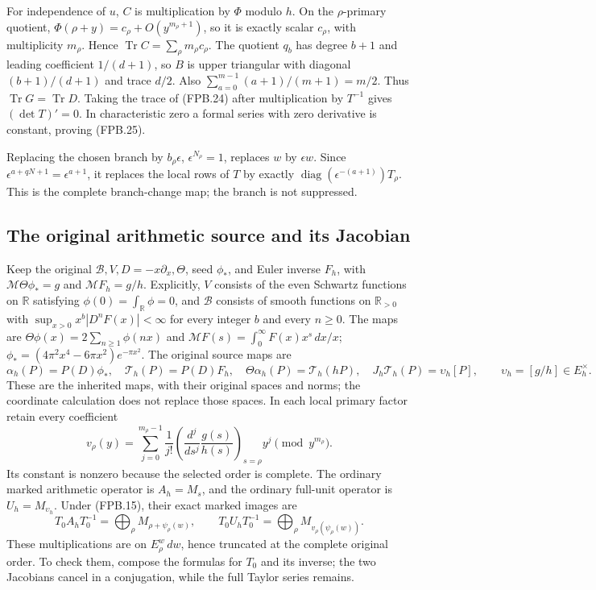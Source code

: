 For independence of \(u\), \(C\) is multiplication by \(\Phi\)
modulo \(h\). On the \(\rho\)-primary quotient,
\(\Phi(\rho+y)=c_\rho+O(y^{m_\rho+1})\), so it is exactly scalar
\(c_\rho\), with multiplicity \(m_\rho\). Hence
\(\operatorname{Tr}C=\sum_\rho m_\rho c_\rho\).
The quotient \(q_b\) has degree \(b+1\) and leading coefficient
\(1/(d+1)\), so \(B\) is upper triangular with diagonal
\((b+1)/(d+1)\) and trace \(d/2\). Also
\(\sum_{a=0}^{m-1}(a+1)/(m+1)=m/2\). Thus
\(\operatorname{Tr}G=\operatorname{Tr}D\).
Taking the trace of (FPB.24) after multiplication by \(T^{-1}\)
gives \((\det T)'=0\). In characteristic zero a formal series with
zero derivative is constant, proving (FPB.25).

Replacing the chosen branch by \(b_\rho\epsilon\),
\(\epsilon^{N_\rho}=1\), replaces \(w\) by \(\epsilon w\).
Since \(\epsilon^{a+qN+1}=\epsilon^{a+1}\), it replaces the local
rows of \(T\) by exactly
\(\operatorname{diag}(\epsilon^{-(a+1)})T_\rho\).
This is the complete branch-change map; the branch is not suppressed.

\subsection{The original arithmetic source and its Jacobian}

Keep the original \(\mathscr B,V,D=-x\partial_x,\Theta\), seed
\(\phi_*\), and Euler inverse \(F_h\), with
\(\mathcal M\Theta\phi_*=g\) and \(\mathcal M F_h=g/h\).
Explicitly, \(V\) consists of the even Schwartz functions on
\(\mathbb R\) satisfying \(\phi(0)=\int_{\mathbb R}\phi=0\),
and \(\mathscr B\) consists of smooth functions on
\(\mathbb R_{>0}\) with
\(\sup_{x>0}x^b|D^nF(x)|<\infty\) for every integer \(b\)
and every \(n\ge0\). The maps are
\(\Theta\phi(x)=2\sum_{n\ge1}\phi(nx)\) and
\(\mathcal MF(s)=\int_0^\infty F(x)x^s\,dx/x\);
\(\phi_*=(4\pi^2x^4-6\pi x^2)e^{-\pi x^2}\).
The original source maps are
\[
 \alpha_h(P)=P(D)\phi_*,\quad
 \mathcal T_h(P)=P(D)F_h,\quad
 \Theta\alpha_h(P)=\mathcal T_h(hP),\quad
 J_h\mathcal T_h(P)=\upsilon_h[P],
 \qquad \upsilon_h=[g/h]\in E_h^\times.
 \tag{FPB.26}\label{eq:fpb-theta}
\]
These are the inherited maps, with their original spaces and norms;
the coordinate calculation does not replace those spaces. In each
local primary factor retain every coefficient
\[
 v_\rho(y)=\sum_{j=0}^{m_\rho-1}
    \frac1{j!}\left(\frac{d^j}{ds^j}\frac{g(s)}{h(s)}
             \right)_{s=\rho}y^j\pmod {y^{m_\rho}}.
 \tag{FPB.27}\label{eq:fpb-unit}
\]
Its constant is nonzero because the selected order is complete.
The ordinary marked arithmetic operator is \(A_h=M_s\), and
the ordinary full-unit operator is \(U_h=M_{\upsilon_h}\).
Under (FPB.15), their exact marked images are
\[
 T_0A_hT_0^{-1}=\bigoplus_\rho M_{\rho+\psi_\rho(w)},\qquad
 T_0U_hT_0^{-1}=\bigoplus_\rho M_{v_\rho(\psi_\rho(w))}.
 \tag{FPB.28}\label{eq:fpb-marked-arithmetic}
\]
These multiplications are on \(E_\rho^w\,dw\), hence truncated
at the complete original order. To check them, compose the formulas
for \(T_0\) and its inverse; the two Jacobians cancel in a
conjugation, while the full Taylor series remains.

